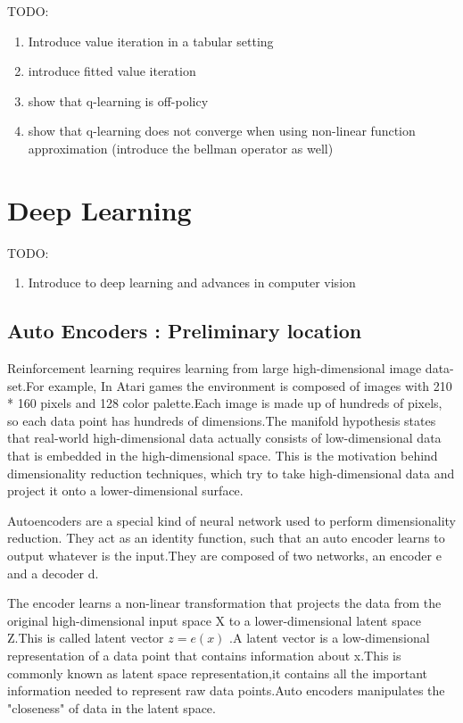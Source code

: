 TODO: 
\begin{enumerate}
		\item Introduce value iteration in a tabular setting
		\item introduce fitted value iteration
		\item show that q-learning is off-policy
		\item show that q-learning does not converge when using non-linear function
				approximation (introduce the bellman operator as well)
\end{enumerate}

\section{Deep Learning }

TODO:
\begin{enumerate}
		\item Introduce to deep learning and advances in computer vision
	\end{enumerate}



\subsection{Auto Encoders : Preliminary location}


Reinforcement learning requires learning from large  high-dimensional image data-set.For example, In Atari games the environment is composed of images with 210 * 160 pixels and 128 color palette.Each image is made up of hundreds of pixels, so each data point has hundreds of dimensions.The manifold hypothesis states that real-world high-dimensional data actually consists of low-dimensional data that is embedded in the high-dimensional space. This is the motivation behind dimensionality reduction techniques, which try to take high-dimensional data and project it onto a lower-dimensional surface.

Autoencoders are a special kind of neural network used to perform dimensionality reduction. They act as an identity function, such that an auto encoder learns to output whatever is the input.They are  composed of two networks, an encoder e and a decoder d.

The encoder learns a non-linear transformation  that projects the data from the original high-dimensional input space X to a lower-dimensional latent space Z.This is called latent  vector  $z=e(x) $ .A latent vector is a low-dimensional representation of a data point that contains information about x.This is commonly known  as latent space representation,it contains all the important information needed to represent raw data points.Auto encoders manipulates the "closeness" of data in the latent space.

